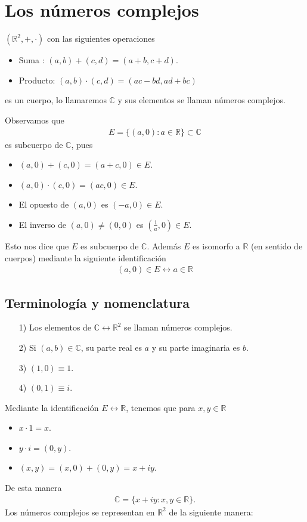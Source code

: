 \chapter{Los números complejos}
$(\mathbb{R}^2, +, \cdot)$ con las siguientes operaciones
\begin{itemize}
    \item Suma : $(a,b) + (c,d) = (a + b, c + d)$.
    \item Producto: $(a,b) \cdot (c,d) = (ac - bd, ad + bc)$
\end{itemize}
es un cuerpo, lo llamaremos $\mathbb{C}$ y sus elementos se llaman números complejos.

Observamos que
\begin{align*}
    E = \{ (a,0) : a \in \mathbb{R} \} \subset \mathbb{C}
\end{align*}
es subcuerpo de $\mathbb{C}$, pues
\begin{itemize}
    \item $(a,0) + (c,0) = (a+c,0) \in E$.
    \item $(a,0) \cdot (c,0) = (ac,0) \in E$.
    \item El opuesto de $(a,0)$ es $(-a,0) \in E$.
    \item El inverso de $(a,0) \not = (0,0)$ es $\left(\frac{1}{a},0\right) \in E$.
\end{itemize}
Esto nos dice que $E$ es subcuerpo de $\mathbb{C}$. Además $E$ es isomorfo a $\mathbb{R}$ (en sentido de cuerpos) mediante la siguiente identificación
\begin{align*}
    (a,0) \in E \longleftrightarrow a \in \mathbb{R}
\end{align*}
\section{Terminología y nomenclatura}
\begin{enumerate}
    \item[1)] Los elementos de $\mathbb{C} \longleftrightarrow \mathbb{R}^2$ se llaman números complejos.
    \item[2)] Si $(a,b) \in \mathbb{C}$, su parte real es $a$ y su parte imaginaria es $b$.
    \item[3)] $(1,0) \equiv 1$.
    \item[4)] $(0,1) \equiv i$.
\end{enumerate}
Mediante la identificación $E \longleftrightarrow \mathbb{R}$, tenemos que para $x,y \in \mathbb{R}$
\begin{itemize}
    \item $x \cdot 1 = x$.
    \item $y \cdot i = (0,y)$.
    \item $(x,y) = (x,0) + (0,y) = x + iy$.
\end{itemize}
De esta manera
\begin{align*}
    \mathbb{C} = \{ x + iy : x,y \in \mathbb{R} \}.
\end{align*}
Los números complejos se representan en $\mathbb{R}^2$ de la siguiente manera:

